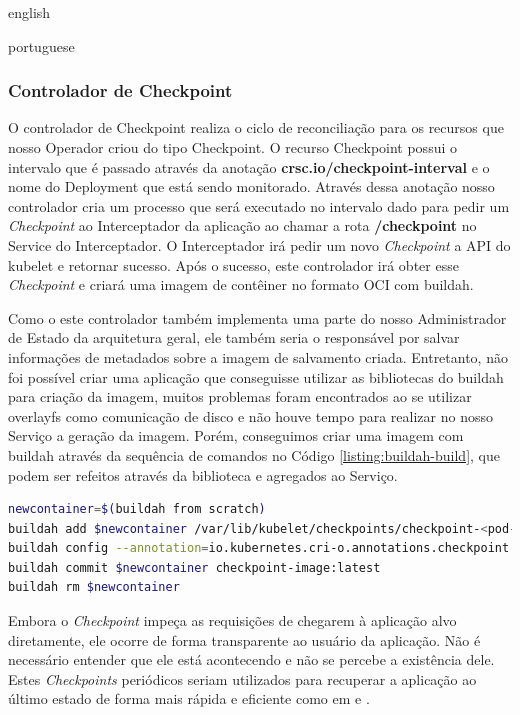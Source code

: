 \begin{otherlanguage*}{english}
\begin{otherlanguage*}{portuguese}
\subsubsection{Controlador de Checkpoint}

O controlador de Checkpoint realiza o ciclo de reconciliação para os recursos que nosso
Operador criou do tipo Checkpoint. O recurso Checkpoint possui o intervalo que é
passado através da anotação \textbf{crsc.io/checkpoint-interval} e o nome do Deployment
que está sendo monitorado. Através dessa anotação nosso controlador cria um processo que
será executado no intervalo dado para pedir um \textit{Checkpoint} ao Interceptador da
aplicação ao chamar a rota \textbf{/checkpoint} no Service do Interceptador. O Interceptador
irá pedir um novo \textit{Checkpoint} a API do kubelet e retornar sucesso. Após o sucesso,
este controlador irá obter esse \textit{Checkpoint} e criará uma imagem de contêiner no
formato OCI com buildah.

Como o este controlador também implementa uma parte do nosso Administrador de Estado da 
arquitetura geral, ele também seria o responsável por salvar informações de metadados
sobre a imagem de salvamento criada. Entretanto, não foi possível criar uma aplicação
que conseguisse utilizar as bibliotecas do buildah para criação da imagem, muitos
problemas foram encontrados ao se utilizar overlayfs como comunicação de disco e não
houve tempo para realizar no nosso Serviço a geração da imagem. Porém, conseguimos criar
uma imagem com buildah através da sequência de comandos no Código
\ref{listing:buildah-build}, que podem ser refeitos através da biblioteca e agregados ao
Serviço.

\begin{lstlisting}[language=bash,caption={Comandos do buildah para construir a imagem de recuperação a partir de um Checkpoint feito pelo CRIU através do kubelet.},label={listing:buildah-build}]
newcontainer=$(buildah from scratch)
buildah add $newcontainer /var/lib/kubelet/checkpoints/checkpoint-<pod-name>_<namespace-name>-<container-name>-<timestamp>.tar /
buildah config --annotation=io.kubernetes.cri-o.annotations.checkpoint.name=<container-name> $newcontainer
buildah commit $newcontainer checkpoint-image:latest
buildah rm $newcontainer
\end{lstlisting}

Embora o \textit{Checkpoint} impeça as requisições de chegarem à aplicação alvo
diretamente, ele ocorre de forma transparente ao usuário da aplicação. Não é
necessário entender que ele está acontecendo e não se percebe a existência dele. 
Estes \textit{Checkpoints} periódicos seriam utilizados para recuperar a aplicação
ao último estado de forma mais rápida e eficiente como em \cite{vayghan2021kubernetes}
\cite{muller2022architecture} \cite{oh2018stateful} e \cite{schmidttransparent}.


\end{otherlanguage*}
\end{otherlanguage*}
